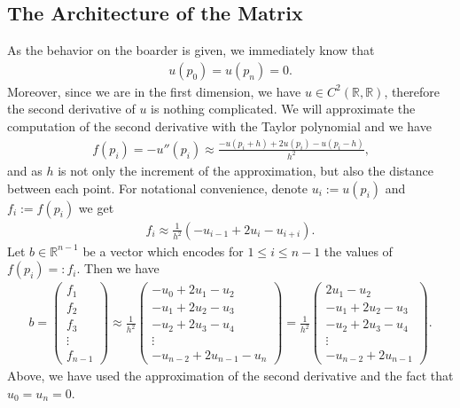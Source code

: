 \subsection{The Architecture of the Matrix}
As the behavior on the boarder is given, we immediately know that
\begin{align*}
    u(p_0) = u(p_n) = 0 \text{.}
\end{align*}
Moreover, since we are in the first dimension, we have \(u \in C^2(\mathbb{R}, \mathbb{R})\), therefore the second derivative of \(u\) is nothing complicated. We will approximate the computation of the second derivative with the Taylor polynomial and we have
\begin{align*}
    f(p_i) = -u''(p_i) \approx \frac{-u(p_i + h) + 2u(p_i) - u(p_i - h)}{h^2} \text{,}
\end{align*}
and as \(h\) is not only the increment of the approximation, but also the distance between each point. For notational convenience, denote \(u_i := u(p_i)\) and \(f_i := f(p_i)\)  we get
\begin{align*}
    f_i \approx \frac{1}{h^2} (-u_{i - 1} + 2u_i - u_{i + i}) \text{.}
\end{align*}
Let \(b \in \mathbb{R}^{n-1}\) be a vector which encodes for \(1 \leq i \leq n-1\) the values of \(f(p_i) =: f_i\). Then we have
\begin{align*}
    b =
    \begin{pmatrix}
        f_1 \\
        f_2 \\
        f_3 \\
        \vdots \\
        f_{n-1}
    \end{pmatrix}
    \approx
    \frac{1}{h^2}
    \begin{pmatrix}
        -u_0 + 2u_1 -u_2 \\
        -u_1 + 2u_2 -u_3 \\
        -u_2 + 2u_3 -u_4 \\
        \vdots \\
        -u_{n-2} + 2u_{n-1} -u_{n}
    \end{pmatrix}
    =
    \frac{1}{h^2}
    \begin{pmatrix}
        2u_1 -u_2 \\
        -u_1 + 2u_2 -u_3 \\
        -u_2 + 2u_3 -u_4 \\
        \vdots \\
        -u_{n-2} + 2u_{n-1}
    \end{pmatrix} \text{.}
\end{align*}
Above, we have used the approximation of the second derivative and the fact that \(u_0 = u_n = 0\).

